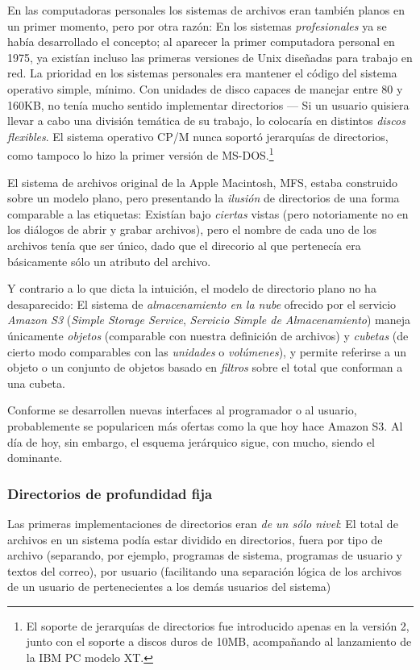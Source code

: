 \documentclass[11pt,fleqn]{book} %
\begin{document}
En las computadoras personales los sistemas de archivos eran también
planos en un primer momento, pero por otra razón: En los sistemas
\emph{profesionales} ya se había desarrollado el concepto; al aparecer la
primer computadora personal en 1975, ya existían incluso las primeras
versiones de Unix diseñadas para trabajo en red. La prioridad en los
sistemas personales era mantener el código del sistema operativo
simple, mínimo. Con unidades de disco capaces de manejar entre 80 y
160KB, no tenía mucho sentido implementar directorios — Si un usuario
quisiera llevar a cabo una división temática de su trabajo, lo
colocaría en distintos \emph{discos flexibles}. El sistema operativo CP/M
nunca soportó jerarquías de directorios, como tampoco lo hizo la
primer versión de MS-DOS.\footnote{El soporte de jerarquías de directorios
fue introducido apenas en la versión 2, junto con el soporte a discos
duros de 10MB, acompañando al lanzamiento de la IBM PC modelo XT. }

El sistema de archivos original de la Apple Macintosh, MFS, estaba
construido sobre un modelo plano, pero presentando la \emph{ilusión} de
directorios de una forma comparable a las etiquetas: Existían bajo
\emph{ciertas} vistas (pero notoriamente no en los diálogos de abrir y
grabar archivos), pero el nombre de cada uno de los archivos tenía que
ser único, dado que el direcorio al que pertenecía era básicamente
sólo un atributo del archivo.

Y contrario a lo que dicta la intuición, el modelo de directorio plano
no ha desaparecido: El sistema de \emph{almacenamiento en la nube} ofrecido
por el servicio \emph{Amazon S3} (\emph{Simple Storage Service}, \emph{Servicio Simple de Almacenamiento}) maneja únicamente \emph{objetos} (comparable con
nuestra definición de archivos) y \emph{cubetas} (de cierto modo
comparables con las \emph{unidades} o \emph{volúmenes}), y permite referirse a
un objeto o un conjunto de objetos basado en \emph{filtros} sobre el total
que conforman a una cubeta.

Conforme se desarrollen nuevas interfaces al programador o al usuario,
probablemente se popularicen más ofertas como la que hoy hace
Amazon S3. Al día de hoy, sin embargo, el esquema jerárquico sigue,
con mucho, siendo el dominante.
\subsubsection{Directorios de profundidad fija}
\label{sec-6-3-1-3}


Las primeras implementaciones de directorios eran \emph{de un sólo nivel}:
El total de archivos en un sistema podía estar dividido en
directorios, fuera por tipo de archivo (separando, por ejemplo,
programas de sistema, programas de usuario y textos del correo), por
usuario (facilitando una separación lógica de los archivos de un
usuario de pertenecientes a los demás usuarios del sistema)
\end{document}
